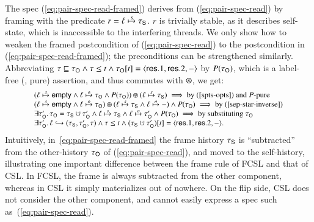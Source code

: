 The spec (\ref{eq:pair-spec-read-framed}) derives from
(\ref{eq:pair-spec-read}) by framing with the predicate $r = \hps
\spts \histS$. $r$ is trivially stable, as it describes self-state,
which is inaccessible to the interfering threads. We only show how to
weaken the framed postcondition of (\ref{eq:pair-spec-read}) to the
postcondition in (\ref{eq:pair-spec-read-framed}); the preconditions
can be strengthened similarly. Abbreviating $\hist \pre \histO \aand
\hist \le t \aand \inat{\angled{\res.1, \res.2, -}}{\histO}{t}$ by
$P(\histO)$, which is a label-free (\ie, pure) assertion, and thus
commutes with $\ssep$, we get:
\[
{\small
\begin{array}{l}
(\hps \spts \hempty \aand \hps \opts \histO \aand P(\histO)) \ssep (\hps \spts \histS) \implies \mbox{by (\ref{spts-opts}) and $P$-pure}\\
(\hps \spts \hempty \aand \hps \opts \histO) \ssep (\hps \spts \histS \aand \hps \opts -) \aand P(\histO) \implies \mbox{by (\ref{sep-star-inverse})}\\
\exists \histO'\ldot \histO = \histS \hunion \histO' \aand 
\hps \spts \histS \aand \hps \opts \histO' \aand P(\histO) \implies \mbox{by substituting $\histO$}\\
\exists \histO'\ldot \histso{\hps}{\histS, \histO', \hist} \aand \hist \le t \aand \inat{\angled{\res.1, \res.2, -}}{(\histS \hunion \histO')}{t}.
\end{array}}
\]
Intuitively, in~\eqref{eq:pair-spec-read-framed} the frame history
$\histS$ is ``subtracted'' from the other-history $\histO$ of
(\ref{eq:pair-spec-read}), and moved to the self-history, illustrating
one important difference between the frame rule of FCSL and that of
CSL. In FCSL, the frame is always subtracted from the other component,
whereas in CSL it simply materializes out of nowhere. On the flip
side, CSL does not consider the other component, and cannot easily
express a spec such as~(\ref{eq:pair-spec-read}).

